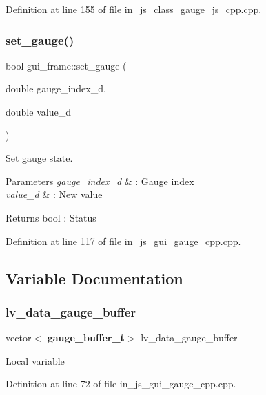 Definition at line 155 of file in\+\_\+js\+\_\+class\+\_\+gauge\+\_\+js\+\_\+cpp.\+cpp.

\mbox{\label{group___gauge_ga22c461ce1eed33b47b0a81edbdda6cea}} 
\subsubsection{set\_gauge()}
{\footnotesize\ttfamily bool gui\+\_\+frame\+::set\+\_\+gauge (\begin{DoxyParamCaption}\item[{double}]{gauge\+\_\+index\+\_\+d,  }\item[{double}]{value\+\_\+d }\end{DoxyParamCaption})}



Set gauge state. 


\begin{DoxyParams}{Parameters}
{\em gauge\+\_\+index\+\_\+d} & \+: Gauge index \\
\hline
{\em value\+\_\+d} & \+: New value \\
\hline
\end{DoxyParams}
\begin{DoxyReturn}{Returns}
bool \+: Status 
\end{DoxyReturn}


Definition at line 117 of file in\+\_\+js\+\_\+gui\+\_\+gauge\+\_\+cpp.\+cpp.



\subsection{Variable Documentation}
\mbox{\label{group___gauge_ga186e7071ff2351292b9b12a7fb0241d1}} 
\subsubsection{lv\_data\_gauge\_buffer}
{\footnotesize\ttfamily vector$<$\textbf{ gauge\+\_\+buffer\+\_\+t}$>$ lv\+\_\+data\+\_\+gauge\+\_\+buffer}

Local variable 

Definition at line 72 of file in\+\_\+js\+\_\+gui\+\_\+gauge\+\_\+cpp.\+cpp.

